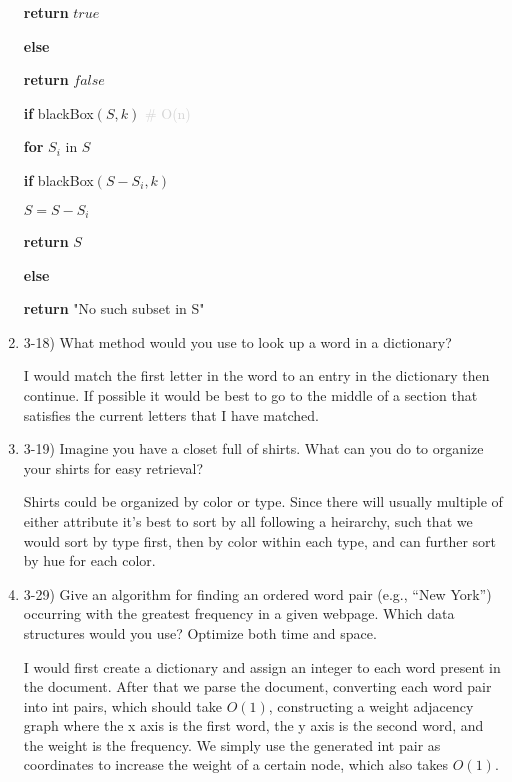 \documentclass{article}
\begin{document}
\begin{enumerate}
{\begin{minipage}{0.8\textwidth}
    \quad \quad \textbf{return} $true$
    
    \quad \textbf{else}
        
    \quad \quad \textbf{return} $false$

    \textbf{if} blackBox$(S, k)$ \textcolor{lightgray}{ \# O(n)}
    
    \quad \textbf{for} $S_i$ in $S$

    \quad \quad \textbf{if} blackBox$(S - S_i, k)$

    \quad \quad \quad $S = S - S_i$

    \quad \textbf{return} $S$

    \textbf{else}

    \quad \textbf{return} "No such subset in S"

    \end{minipage}
    }

    \item 3-18) What method would you use to look up a word in a dictionary?
    
    I would match the first letter in the word to an entry in the dictionary then continue. If possible it would be best to go to the middle of a section that satisfies the current letters that I have matched.
    
    \item 3-19) Imagine you have a closet full of shirts. What can you do to organize your shirts for easy retrieval?
    
    Shirts could be organized by color or type. Since there will usually multiple of either attribute it's best to sort by all following a heirarchy, such that we would sort by type first, then by color within each type, and can further sort by hue for each color.
    
    \item 3-29) Give an algorithm for finding an ordered word pair (e.g., “New York”) occurring with the greatest frequency in a given webpage. Which data structures would you use? Optimize both time and space. 

    I would first create a dictionary and assign an integer to each word present in the document. After that we parse the document, converting each word pair into int pairs, which should take $O(1)$, constructing a weight adjacency graph where the x axis is the first word, the y axis is the second word, and the weight is the frequency. We simply use the generated int pair as coordinates to increase the weight of a certain node, which also takes $O(1)$. 



\end{enumerate}
\end{document}
